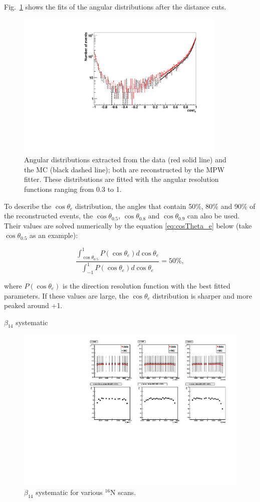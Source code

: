 Fig.~\ref{angularResolMPW} shows the fits of the angular distributions after the distance cuts.
\begin{figure}
	\centering
	\includegraphics[width=10cm]{16NangularResol.pdf}
	\caption{Angular distributions extracted from the data (red solid line) and the MC (black dashed line); both are reconstructed by the MPW fitter. These distributions are fitted with the angular resolution functions ranging from 0.3 to 1.}
	\label{angularResolMPW}
\end{figure}

To describe the $\cos\theta_e$ distribution, the angles that contain 50\%, 80\%
and 90\% of the reconstructed events, the $\cos\theta_{0.5}$, $\cos\theta_{0.8}$ and $\cos\theta_{0.9}$ can also be used. Their values are solved numerically by the equation \ref{eq:cosTheta_e} below (take $\cos\theta_{0.5}$ as an example):

\begin{equation}\label{eq:cosTheta_e}
\frac{\int_{\cos\theta_{0.5}}^1 P(\cos\theta_e) d\cos\theta_e}{\int_{-1}^1 P(\cos\theta_e) d\cos\theta_e} = 50\%,
\end{equation}

where $P(\cos\theta_e)$ is the direction resolution function with the best fitted parameters. If these values are large, the $\cos\theta_e$ distribution is sharper and more peaked around +1.

$\beta_{14}$ systematic
\begin{figure}[htbp]
	\centering
	\includegraphics[width=15cm]{beta14_allScans.pdf}
	\caption{$\beta_{14}$ systematic for various $^{16}$N scans.}
	\label{beta14_scans}
\end{figure}




